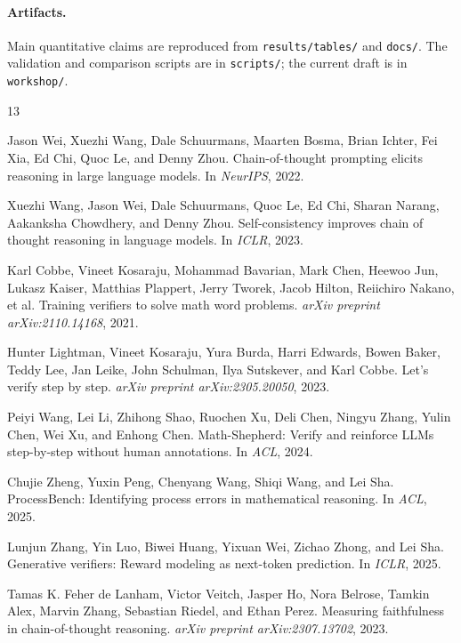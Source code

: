 \documentclass[10pt]{article}
\begin{document}
\paragraph{Artifacts.}
Main quantitative claims are reproduced from \texttt{results/tables/} and \texttt{docs/}. The validation and comparison scripts are in \texttt{scripts/}; the current draft is in \texttt{workshop/}.


\begin{thebibliography}{13}

Jason Wei, Xuezhi Wang, Dale Schuurmans, Maarten Bosma, Brian Ichter, Fei Xia, Ed Chi, Quoc Le, and Denny Zhou.
\newblock Chain-of-thought prompting elicits reasoning in large language models.
\newblock In \emph{NeurIPS}, 2022.

Xuezhi Wang, Jason Wei, Dale Schuurmans, Quoc Le, Ed Chi, Sharan Narang, Aakanksha Chowdhery, and Denny Zhou.
\newblock Self-consistency improves chain of thought reasoning in language models.
\newblock In \emph{ICLR}, 2023.

Karl Cobbe, Vineet Kosaraju, Mohammad Bavarian, Mark Chen, Heewoo Jun, Lukasz Kaiser, Matthias Plappert, Jerry Tworek, Jacob Hilton, Reiichiro Nakano, et al.
\newblock Training verifiers to solve math word problems.
\newblock \emph{arXiv preprint arXiv:2110.14168}, 2021.

Hunter Lightman, Vineet Kosaraju, Yura Burda, Harri Edwards, Bowen Baker, Teddy Lee, Jan Leike, John Schulman, Ilya Sutskever, and Karl Cobbe.
\newblock Let's verify step by step.
\newblock \emph{arXiv preprint arXiv:2305.20050}, 2023.

Peiyi Wang, Lei Li, Zhihong Shao, Ruochen Xu, Deli Chen, Ningyu Zhang, Yulin Chen, Wei Xu, and Enhong Chen.
\newblock Math-Shepherd: Verify and reinforce {LLM}s step-by-step without human annotations.
\newblock In \emph{ACL}, 2024.

Chujie Zheng, Yuxin Peng, Chenyang Wang, Shiqi Wang, and Lei Sha.
\newblock ProcessBench: Identifying process errors in mathematical reasoning.
\newblock In \emph{ACL}, 2025.

Lunjun Zhang, Yin Luo, Biwei Huang, Yixuan Wei, Zichao Zhong, and Lei Sha.
\newblock Generative verifiers: Reward modeling as next-token prediction.
\newblock In \emph{ICLR}, 2025.

Tamas K. Feher de Lanham, Victor Veitch, Jasper Ho, Nora Belrose, Tamkin Alex, Marvin Zhang, Sebastian Riedel, and Ethan Perez.
\newblock Measuring faithfulness in chain-of-thought reasoning.
\newblock \emph{arXiv preprint arXiv:2307.13702}, 2023.


\end{thebibliography}
\end{document}
